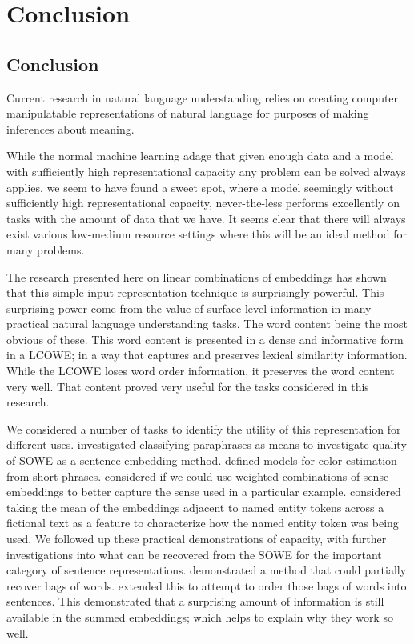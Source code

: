 \documentclass{book}
\begin{document}
\part{Conclusion}
\chapter{Conclusion}
Current research in natural language understanding relies on creating computer manipulatable representations of natural language for purposes of making inferences about meaning.


While the normal machine learning adage that given enough data and a model with sufficiently high representational capacity any problem can be solved always applies,
we seem to have found a sweet spot, 
where a model seemingly without sufficiently high representational capacity,
never-the-less performs excellently on tasks with the amount of data that we have.
It seems clear that there will always exist various low-medium resource settings where this will be an ideal method for many problems.


The research presented here on linear combinations of embeddings has shown that this simple input representation technique is surprisingly powerful.
This surprising power come from the value of surface level information in many practical natural language understanding tasks.
The word content being the most obvious of these.
This word content is presented in a dense and informative form in a LCOWE; in a way that captures and preserves lexical similarity information.
While the LCOWE loses word order information, it preserves the word content very well.
That content proved very useful for the tasks considered in this research.


We considered a number of tasks to identify the utility of this representation for different uses.
 investigated classifying paraphrases as means to investigate quality of SOWE as a sentence embedding method.
 defined models for color estimation from short phrases.
 considered if we could use weighted combinations of sense embeddings to better capture the sense used in a particular example.
 considered taking the mean of the embeddings adjacent to named entity tokens across a fictional text as a feature to characterize how the named entity token was being used.
We followed up these practical demonstrations of capacity,
with further investigations into what can be recovered from the SOWE for the important category of sentence representations.
 demonstrated a method that could partially recover bags of words.
 extended this to attempt to order those bags of words into sentences.
This demonstrated that a surprising amount of information is still available in the summed embeddings; which helps to explain why they work so well.
\end{document}

